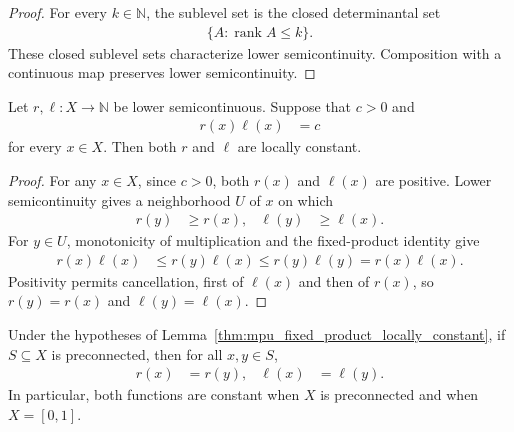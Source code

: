 \begin{proof}\leanok
    For every $k\in\mathbb N$, the sublevel set is the closed determinantal set
    \begin{align}
        \{A:\operatorname{rank}A\leq k\}.
    \end{align}
    These closed sublevel sets characterize lower semicontinuity. Composition
    with a continuous map preserves lower semicontinuity.
\end{proof}

\begin{lemma}
    \label{thm:mpu_fixed_product_locally_constant}
    \leanok
    Let $r,\ell\colon X\to\mathbb N$ be lower semicontinuous. Suppose that
    $c>0$ and
    \begin{align}
        r(x)\ell(x) & =c
    \end{align}
    for every $x\in X$. Then both $r$ and $\ell$ are locally constant.
\end{lemma}

\begin{proof}\leanok
    For any $x\in X$, since $c>0$, both $r(x)$ and $\ell(x)$ are positive. Lower
    semicontinuity gives a neighborhood $U$ of $x$ on which
    \begin{align}
        r(y) & \geq r(x), & \ell(y) & \geq\ell(x).
    \end{align}
    For $y\in U$, monotonicity of multiplication and the fixed-product identity
    give
    \begin{align}
        r(x)\ell(x)
         & \leq r(y)\ell(x)
        \leq r(y)\ell(y)
        =r(x)\ell(x).
    \end{align}
    Positivity permits cancellation, first of $\ell(x)$ and then of $r(x)$, so
    $r(y)=r(x)$ and $\ell(y)=\ell(x)$.
\end{proof}

\begin{lemma}
    \label{thm:mpu_fixed_product_preconnected}
    \leanok
    Under the hypotheses of
    Lemma~\ref{thm:mpu_fixed_product_locally_constant}, if $S\subseteq X$ is
    preconnected, then for all $x,y\in S$,
    \begin{align}
        r(x) & =r(y), & \ell(x) & =\ell(y).
    \end{align}
    In particular, both functions are constant when $X$ is preconnected and
    when $X=[0,1]$.
\end{lemma}

